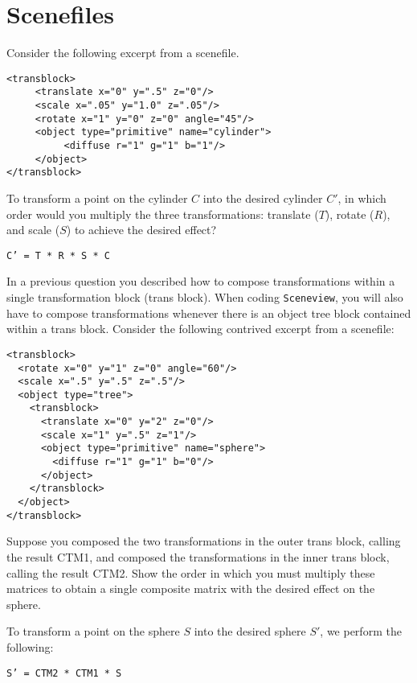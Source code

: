 \documentclass[10pt,twocolumn]{article}
\begin{document}
\section{Scenefiles}
Consider the following excerpt from a scenefile.
\begin{verbatim}
<transblock>
     <translate x="0" y=".5" z="0"/>
     <scale x=".05" y="1.0" z=".05"/>
     <rotate x="1" y="0" z="0" angle="45"/>
     <object type="primitive" name="cylinder">
          <diffuse r="1" g="1" b="1"/> 
     </object>
</transblock>
\end{verbatim}

\begin{framed}
  To transform a point on the cylinder $C$ into the desired cylinder $C'$, in which order would you multiply the three transformations: translate ($T$), rotate ($R$), and scale ($S$) to achieve the desired effect?

\begin{center}
\texttt{C' = T * R * S * C}
\end{center}
\end{framed}

\noindent In a previous question you described how to compose transformations within a single transformation block (trans block). When coding {\tt Sceneview}, you will also have to compose transformations whenever there is an object tree block contained within a trans block. Consider the following contrived excerpt from a scenefile:
\begin{verbatim}
<transblock>
  <rotate x="0" y="1" z="0" angle="60"/> 
  <scale x=".5" y=".5" z=".5"/>
  <object type="tree">
    <transblock>
      <translate x="0" y="2" z="0"/>
      <scale x="1" y=".5" z="1"/>
      <object type="primitive" name="sphere">
        <diffuse r="1" g="1" b="0"/> 
      </object>
    </transblock> 
  </object>
</transblock>
\end{verbatim}

\begin{framed}
  Suppose you composed the two transformations in the outer trans block, calling the result CTM1, and composed the transformations in the inner trans block, calling the result CTM2. Show the order in which you must multiply these matrices to obtain a single composite matrix with the desired effect on the sphere.

To transform a point on the sphere $S$ into the desired sphere $S'$, we perform the following:
\begin{center}
\texttt{S' = CTM2 * CTM1 * S}
\end{center}
\end{framed}
\end{document}
